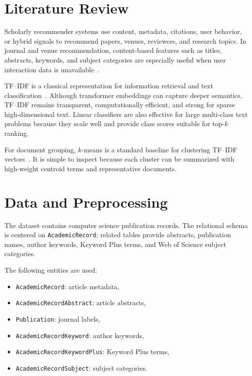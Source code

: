 \documentclass[conference]{IEEEtran}
\begin{document}
\section{Literature Review}
Scholarly recommender systems use content, metadata, citations, user behavior, or hybrid signals to recommend papers, venues, reviewers, and research topics. In journal and venue recommendation, content-based features such as titles, abstracts, keywords, and subject categories are especially useful when user interaction data is unavailable~\cite{khadka2025,mumtaz2022}.

TF--IDF is a classical representation for information retrieval and text classification~\cite{manning2008}. Although transformer embeddings can capture deeper semantics, TF--IDF remains transparent, computationally efficient, and strong for sparse high-dimensional text. Linear classifiers are also effective for large multi-class text problems because they scale well and provide class scores suitable for top-$k$ ranking.

For document grouping, $k$-means is a standard baseline for clustering TF--IDF vectors~\cite{steinbach2000}. It is simple to inspect because each cluster can be summarized with high-weight centroid terms and representative documents.

\section{Data and Preprocessing}
The dataset contains computer science publication records. The relational schema is centered on \texttt{AcademicRecord}; related tables provide abstracts, publication names, author keywords, Keyword Plus terms, and Web of Science subject categories.

The following entities are used:

\begin{itemize}
    \item \texttt{AcademicRecord}: article metadata,
    \item \texttt{AcademicRecordAbstract}: article abstracts,
    \item \texttt{Publication}: journal labels,
    \item \texttt{AcademicRecordKeyword}: author keywords,
    \item \texttt{AcademicRecordKeywordPlus}: Keyword Plus terms,
    \item \texttt{AcademicRecordSubject}: subject categories.
\end{itemize}
\end{document}
